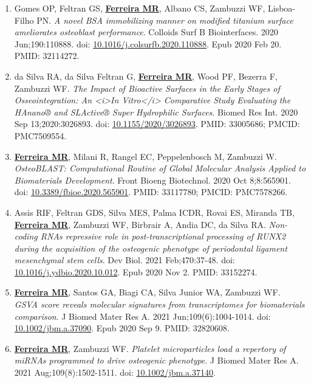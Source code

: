 \documentclass[
  letterpaper,
  DIV=11,
  numbers=noendperiod]{scrartcl}
\begin{document}
\begin{enumerate}
\item
  Gomes OP, Feltran GS, \ul{\textbf{Ferreira MR}}, Albano CS, Zambuzzi
  WF, Lisboa-Filho PN. \emph{A novel BSA immobilizing manner on modified
  titanium surface ameliorates osteoblast performance}. Colloids Surf B
  Biointerfaces. 2020 Jun;190:110888. doi:
  \href{https://www.doi.org/10.1016/j.colsurfb.2020.110888}{10.1016/j.colsurfb.2020.110888}.
  Epub 2020 Feb 20. PMID: 32114272.
\item
  da Silva RA, da Silva Feltran G, \ul{\textbf{Ferreira MR}}, Wood PF,
  Bezerra F, Zambuzzi WF. \emph{The Impact of Bioactive Surfaces in the
  Early Stages of Osseointegration: An \textless i\textgreater In
  Vitro\textless/i\textgreater{} Comparative Study Evaluating the
  HAnano® and SLActive® Super Hydrophilic Surfaces}. Biomed Res Int.
  2020 Sep 13;2020:3026893. doi:
  \href{https://www.doi.org/10.1155/2020/3026893}{10.1155/2020/3026893}.
  PMID: 33005686; PMCID: PMC7509554.
\item
  \ul{\textbf{Ferreira MR}}, Milani R, Rangel EC, Peppelenbosch M,
  Zambuzzi W. \emph{OsteoBLAST: Computational Routine of Global
  Molecular Analysis Applied to Biomaterials Development}. Front Bioeng
  Biotechnol. 2020 Oct 8;8:565901. doi:
  \href{https://www.doi.org/10.3389/fbioe.2020.565901}{10.3389/fbioe.2020.565901}.
  PMID: 33117780; PMCID: PMC7578266.
\item
  Assis RIF, Feltran GDS, Silva MES, Palma ICDR, Rovai ES, Miranda TB,
  \ul{\textbf{Ferreira MR}}, Zambuzzi WF, Birbrair A, Andia DC, da Silva
  RA. \emph{Non-coding RNAs repressive role in post-transcriptional
  processing of RUNX2 during the acquisition of the osteogenic phenotype
  of periodontal ligament mesenchymal stem cells}. Dev Biol. 2021
  Feb;470:37-48. doi:
  \href{https://www.doi.org/10.1016/j.ydbio.2020.10.012}{10.1016/j.ydbio.2020.10.012}.
  Epub 2020 Nov 2. PMID: 33152274.
\item
  \ul{\textbf{Ferreira MR}}, Santos GA, Biagi CA, Silva Junior WA,
  Zambuzzi WF. \emph{GSVA score reveals molecular signatures from
  transcriptomes for biomaterials comparison}. J Biomed Mater Res A.
  2021 Jun;109(6):1004-1014. doi:
  \href{https://www.doi.org/10.1002/jbm.a.37090}{10.1002/jbm.a.37090}.
  Epub 2020 Sep 9. PMID: 32820608.
\item
  \ul{\textbf{Ferreira MR}}, Zambuzzi WF. \emph{Platelet microparticles
  load a repertory of miRNAs programmed to drive osteogenic phenotype}.
  J Biomed Mater Res A. 2021 Aug;109(8):1502-1511. doi:
  \href{https://www.doi.org/10.1002/jbm.a.37140}{10.1002/jbm.a.37140}.

\end{enumerate}
\end{document}
